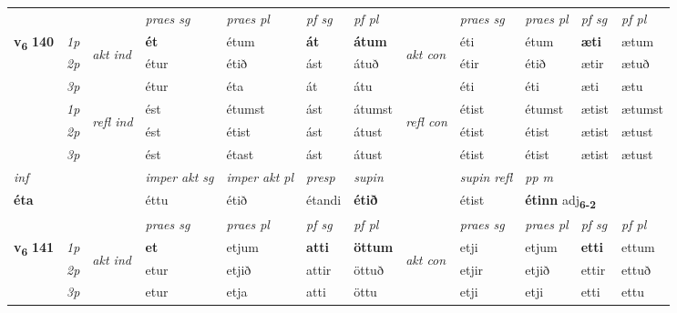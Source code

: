 \begin{longtable}[l]{X>{\footnotesize\itshape}llXXXXlXXXX}
 & &   & \textit{praes sg}  & \textit{praes pl}    & \textit{ pf sg} & \textit{pf pl} & & \textit{praes sg}  & \textit{praes pl}    & \textit{pf sg} & \textit{pf pl }  \\ \cmidrule{4-7} \cmidrule{9-12}
 \multirow{2}{*}{{{\textbf{v{\textsubscript{6}}} \Large{\textbf{140}}}}}  & 1p & \multirow{3}{*}{\begin{turn}{90}\textit{akt ind}\end{turn}} & \textbf{ét} & étum & \textbf{át} & \textbf{átum} & \multirow{3}{*}{\begin{turn}{90}\textit{akt con}\end{turn}} &éti & étum & \textbf{æti} & ætum\\*
 & 2p &  &  étur  & étið & ást & átuð & & étir & étið & ætir & ætuð \\*
 & 3p &  & étur & éta & át & átu & & éti & éti& æti & ætu \\*
\cmidrule{4-7} \cmidrule{9-12}
 & 1p & \multirow{3}{*}{\begin{turn}{90}\textit{refl ind}\end{turn}}  & ést & étumst & ást & átumst & \multirow{3}{*}{\begin{turn}{90}\textit{refl con}\end{turn}}  &étist & étumst & ætist & ætumst \\*
 & 2p &  & ést & étist & ást & átust & &étist & étist & ætist & ætust \\*
 & 3p  & & ést & étast & ást & átust & & étist & étist& ætist & ætust \\*
\cmidrule{4-7} \cmidrule{9-12}

   {\textit{inf}} & &  & \textit{imper akt sg} & \textit{imper akt pl}   & \textit{presp} & \textit{supin} && \textit{supin refl} & \textit{pp m} \\*
  {\textbf{éta}} & && éttu  & étið   & étandi &  \textbf{étið} && étist & \multicolumn{2}{l}{\textbf{étinn} adj\textbf{\textsubscript{6-2}}} \\*

\midrule

 \midrule
 & &   & \textit{praes sg}  & \textit{praes pl}    & \textit{ pf sg} & \textit{pf pl} & & \textit{praes sg}  & \textit{praes pl}    & \textit{pf sg} & \textit{pf pl }  \\ \cmidrule{4-7} \cmidrule{9-12}
 \multirow{2}{*}{{{\textbf{v{\textsubscript{6}}} \Large{\textbf{141}}}}}  & 1p & \multirow{3}{*}{\begin{turn}{90}\textit{akt ind}\end{turn}} & \textbf{et} & etjum & \textbf{atti} & \textbf{öttum} & \multirow{3}{*}{\begin{turn}{90}\textit{akt con}\end{turn}} &etji & etjum & \textbf{etti} & ettum\\*
 & 2p &  &  etur  & etjið & attir & öttuð & & etjir & etjið & ettir & ettuð \\*
 & 3p &  & etur & etja & atti & öttu & & etji & etji& etti & ettu \\*
\cmidrule{4-7} \cmidrule{9-12}


\end{longtable}
